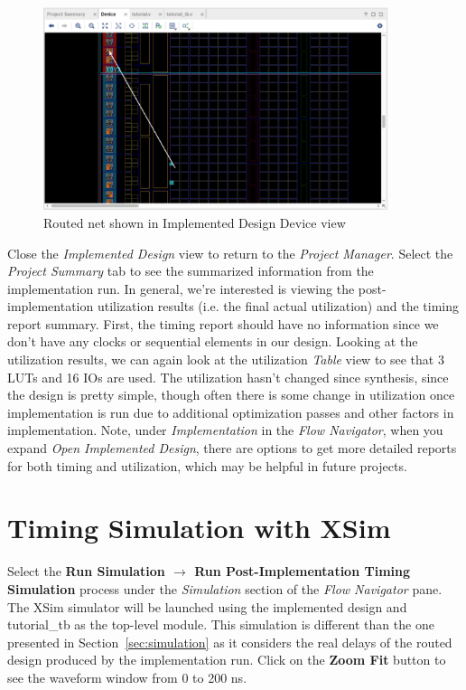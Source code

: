 \documentclass[11pt]{article}
\begin{document}
\begin{figure}[!h]
    \centering
    \includegraphics[width=0.9\textwidth]{images/net_route.png}
    \caption{Routed net shown in Implemented Design Device view}
    \label{fig:net_route}
\end{figure}

Close the \textit{Implemented Design} view  to return to the \textit{Project Manager}. Select the \textit{Project Summary} tab to see the summarized information from the implementation run. In general, we're interested is viewing the post-implementation utilization results (i.e. the final actual utilization) and the timing report summary. First, the timing report should have no information since we don't have any clocks or sequential elements in our design. Looking at the utilization results, we can again look at the utilization \textit{Table} view to see that 3 LUTs and 16 IOs are used. The utilization hasn't changed since synthesis, since the design is pretty simple, though often there is some change in utilization once implementation is run due to additional optimization passes and other factors in implementation. Note, under \textit{Implementation} in the \textit{Flow Navigator}, when you expand \textit{Open Implemented Design}, there are options to get more detailed reports for both timing and utilization, which may be helpful in future projects.




\section{Timing Simulation with XSim}
\label{sec:timing_sim}
Select the \textbf{Run Simulation $\rightarrow$ Run Post-Implementation Timing Simulation} process under the \textit{Simulation} section of the \textit{Flow Navigator} pane. The XSim simulator will be launched using the implemented design and tutorial\_tb as the top-level module. This simulation is different than the one presented in Section~\ref{sec:simulation} as it considers the real delays of the routed design produced by the implementation run. Click on the \textbf{Zoom Fit} button to see the waveform window from 0 to 200 ns.
\end{document}
